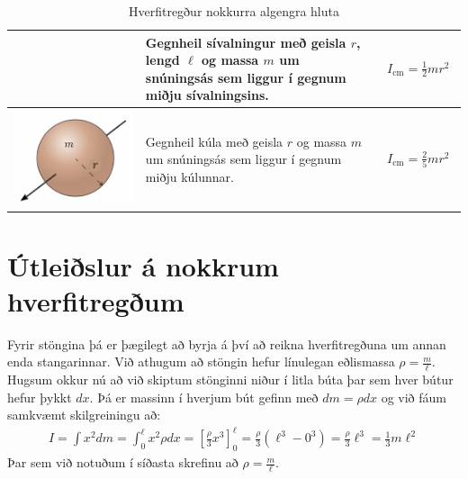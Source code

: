 \ifdefined \wholebook \else\documentclass[oneside]{book}\usepackage{EdlBook}\graphicspath{{figures/}}
\begin{document}
\begin{table}[h!]
\begin{tabular}{ | c | m{5cm} | m{5cm} | }
\begin{minipage}{.3\textwidth}
      \vspace{0.3cm}
    \end{minipage}
    &
      Gegnheil sívalningur með geisla $r$, lengd $\ell$ og massa $m$ um snúningsás sem liggur í gegnum miðju sívalningsins.
    & 
      \begin{align*}
          I_{\text{cm}} = \frac{1}{2}mr^2
      \end{align*}
    \\ \hline
                \begin{minipage}{.3\textwidth}
        \vspace{0.3cm}
    \centering
      \includegraphics[width=0.75\linewidth]{momentsOfInertia/gkula.pdf}
      \vspace{0.3cm}
    \end{minipage}
    &
      Gegnheil kúla með geisla $r$ og massa $m$ um snúningsás sem liggur í gegnum miðju kúlunnar.
    & 
      \begin{align*}
          I_{\text{cm}} = \frac{2}{5}mr^2
      \end{align*}
    \\ \hline
    
    
  \end{tabular}
  \caption{Hverfitregður nokkurra algengra hluta} \label{table:hverfi}
\end{table}


\section{Útleiðslur á nokkrum hverfitregðum}

Fyrir stöngina þá er þægilegt að byrja á því að reikna hverfitregðuna um annan enda stangarinnar. Við athugum að stöngin hefur línulegan eðlismassa $\rho = \frac{m}{\ell}$. Hugsum okkur nú að við skiptum stönginni niður í litla búta þar sem hver bútur hefur þykkt $dx$. Þá er massinn í hverjum bút gefinn með $dm = \rho dx$ og við fáum samkvæmt skilgreiningu að:
\begin{align*}
    I = \int x^2dm = \int_{0}^{\ell}  x^2 \rho dx =  \left[ \frac{\rho}{3}x^3 \right]_{0}^{\ell} = \frac{\rho}{3}\left( \ell^3 - 0^3 \right) = \frac{\rho}{3}\ell^3 = \frac{1}{3}m\ell^2
\end{align*}
Þar sem við notuðum í síðasta skrefinu að $\rho = \frac{m}{\ell}$.
\end{document}
